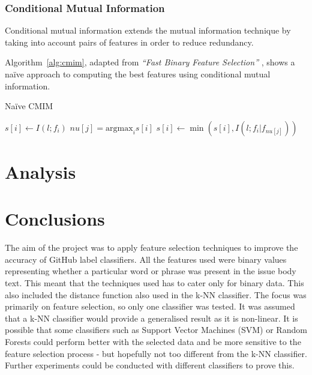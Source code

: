 \subsubsection{Conditional Mutual Information}
Conditional mutual information extends the mutual information technique by taking into account pairs of features in order to
reduce redundancy.

Algorithm~\ref{alg:cmim}, adapted from \emph{``Fast Binary Feature Selection''} \cite{fast_binary_feature_selection}, shows a
na\"{i}ve approach to computing the best features using conditional mutual information.

\begin{algorithm}
	\label{alg:cmim}
	\caption{Na\"{i}ve CMIM}
	\begin{algorithmic}
			\STATE $s[i] \gets I(l;f_i)$
		\ENDFOR
			\STATE $nu[j] = \mathrm{argmax}_i s[i]$
				\STATE $s[i] \gets \min(s[i], I(l;f_i | f_{nu[j]}))$
			\ENDFOR
		\ENDFOR
	\end{algorithmic}
\end{algorithm}

\todo{}

\section{Analysis}
\todo{}
\cite{stability_feature_ranking}
\cite{redundant_feature_elimination}

\cite{mltechniques_spamfiltering}
\cite{mlmethods_spamfiltering}

\section{Conclusions}
The aim of the project was to apply feature selection techniques to improve the accuracy of GitHub label classifiers. All the
features used were binary values representing whether a particular word or phrase was present in the issue body text. This meant
that the techniques used has to cater only for binary data. This also included the distance function also used in the k-NN
classifier. The focus was primarily on feature selection, so only one classifier was tested. It was assumed that a k-NN
classifier would provide a generalised result as it is non-linear. It is possible that some classifiers such as Support Vector
Machines (SVM) or Random Forests could perform better with the selected data and be more sensitive to the feature selection
process - but hopefully not too different from the k-NN classifier. Further experiments could be conducted with different
classifiers to prove this.

